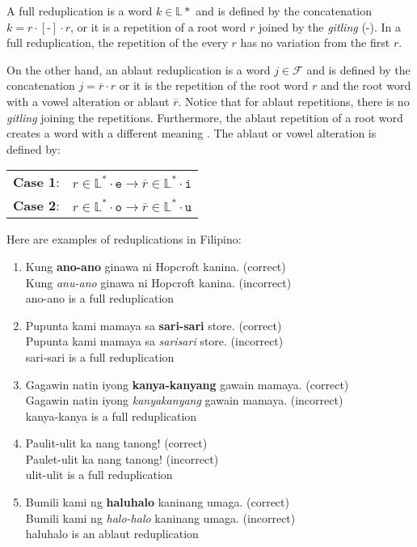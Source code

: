 A full reduplication is a word \(k \in \mathbb{L}*\) and is defined by the concatenation
\(k = r \cdot [\texttt{-}] \cdot r\),
or it is a repetition of a root word \(r\) joined by the \textit{gitling} (-).
In a full reduplication, the repetition of the every \(r\) has no variation from the first \(r\).

On the other hand, an ablaut reduplication is a word \(j \in \mathcal{F}\) and is defined by the
concatenation \(j = \overline{r}\cdot r \) or it is the repetition of the root word \(r\) and the root word with a vowel alteration or ablaut \(\overline{r}\). Notice
that for ablaut repetitions, there is no \textit{gitling} joining the repetitions. Furthermore,
the ablaut repetition of a root word creates a word with a different meaning \cite{OOP}. The ablaut or vowel
alteration is defined by:

\begin{tabular}{l c}
    \textbf{Case 1}: & \(r\in \mathbb{L}^* \cdot \texttt{e} \rightarrow \overline{r} \in \mathbb{L}^* \cdot \texttt{i}\) \\
    \textbf{Case 2}: & \(r\in \mathbb{L}^* \cdot \texttt{o} \rightarrow \overline{r} \in \mathbb{L}^* \cdot \texttt{u}\)
\end{tabular}

\begin{example}
    Here are examples of reduplications in Filipino:
\end{example}
\begin{enumerate}
    \item Kung \textbf{ano-ano} ginawa ni Hopcroft kanina. (correct) \\
          Kung \textit{anu-ano} ginawa ni Hopcroft kanina. (incorrect) \\
          ano-ano is a full reduplication
    \item Pupunta kami mamaya sa \textbf{sari-sari} store. (correct) \\
          Pupunta kami mamaya sa \textit{sarisari} store. (incorrect) \\
          sari-sari is a full reduplication
    \item Gagawin natin iyong \textbf{kanya-kanyang} gawain mamaya. (correct) \\
          Gagawin natin iyong \textit{kanyakanyang} gawain mamaya. (incorrect) \\
          kanya-kanya is a full reduplication
    \item Paulit-ulit ka nang tanong! (correct) \\
          Paulet-ulit ka nang tanong! (incorrect) \\
          ulit-ulit is a full reduplication
    \item Bumili kami ng \textbf{haluhalo} kaninang umaga. (correct) \\
          Bumili kami ng \textit{halo-halo} kaninang umaga. (incorrect) \\
          haluhalo is an ablaut reduplication
\end{enumerate}

